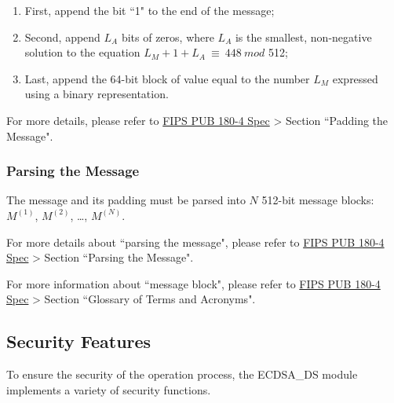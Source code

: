 \documentclass[main\_\_EN.tex]{subfiles}
\begin{document}
\begin{enumerate}
    \item First, append the bit ``1" to the end of the message;
    \item Second, append \begin{math} L_A \end{math} bits of zeros, where \begin{math} L_A \end{math} is the smallest, non-negative solution to the equation \begin{math}L_M + 1 + L_A \ {\equiv} \ 448 \ mod \end{math} 512;
    \item Last, append the 64-bit block of value equal to the number \begin{math} L_M \end{math} expressed using a binary representation.
\end{enumerate}

For more details, please refer to \href{https://doi.org/10.6028/NIST.FIPS.180-4}{FIPS PUB 180-4 Spec} > Section ``Padding the Message".

\subsubsection{Parsing the Message}\label{sec:ecdsa-msg-parsing}

The message and its padding must be parsed into \begin{math}N\end{math} 512-bit message blocks: \begin{math}M^{(1)}\end{math}, \begin{math}M^{(2)}\end{math}, \dots, \begin{math}M^{(N)}\end{math}.

For more details about ``parsing the message", please refer to \href{https://doi.org/10.6028/NIST.FIPS.180-4}{FIPS PUB 180-4 Spec} > Section ``Parsing the Message".

For more information about ``message block", please refer to \href{https://doi.org/10.6028/NIST.FIPS.180-4}{FIPS PUB 180-4 Spec} > Section ``Glossary of Terms and Acronyms".


\subsection{Security Features}
\label{sec:ecdsa-security_features}
To ensure the security of the operation process, the ECDSA\_DS module implements a variety of security functions.
\end{document}

